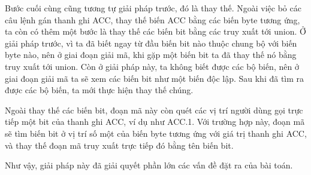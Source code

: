 
Bước cuối cùng cũng tương tự giải pháp trước, đó là thay thế. Ngoài việc bỏ các câu lệnh gán thanh ghi ACC, thay thế biến ACC bằng các biến byte tương ứng, ta còn có thêm một bước là thay thế các biến bit bằng các truy xuất tới union. Ở giải pháp trước, vì ta đã biết ngay từ đầu biến bit nào thuộc chung bộ với biến byte nào, nên ở giai đoạn giải mã, khi gặp một biến bit ta đã thay thế nó bằng truy xuất tới union. Còn ở giải pháp này, ta không biết được các bộ biến, nên ở giai đoạn giải mã ta sẽ xem các biến bit như một biến độc lập. Sau khi đã tìm ra được các bộ biến, ta mới thực hiện thay thế chúng.


Ngoài thay thế các biến bit, đoạn mã này còn quét các vị trí người dùng gọi trực tiếp một bit của thanh ghi ACC, ví dụ như ACC.1. Với trường hợp này, đoạn mã sẽ tìm biến bit ở vị trí số một của biến byte tương ứng với giá trị thanh ghi ACC, và thay thế đoạn mã truy xuất trực tiếp đó bằng tên biến bit. 


Như vậy, giải pháp này đã giải quyết phần lớn các vấn đề đặt ra của bài toán. 

